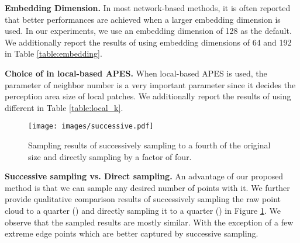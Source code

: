 \documentclass[10pt,twocolumn,letterpaper]{article}
\begin{document}
\textbf{Embedding Dimension.}
In most network-based methods, it is often reported that better performances are achieved when a larger embedding dimension is used. In our experiments, we use an embedding dimension of 128 as the default. We additionally report the results of using embedding dimensions of 64 and 192 in Table \ref{table:embedding}.

\textbf{Choice of  in local-based APES.}
When local-based APES is used, the parameter of neighbor number  is a very important parameter since it decides the perception area size of local patches. We additionally report the results of using different  in Table \ref{table:local_k}. 


\begin{table}[t]
\centering
{}
\caption{Ablation study of using a different number of neighbors for local-based edge point sampling.}
\label{table:local_k}
\end{table}

\begin{table}[t]
\centering
{}
\caption{Ablation study of considering the edge supervision. Results of using it for pre-training or joint training are both presented.}
\label{table:edgeSupervision}
\end{table}

\begin{figure}[t]
    \centering
    \texttt{[image: images/successive.pdf]} 
    \caption{Sampling results of successively sampling to a fourth of the original size and directly sampling by a factor of four. }
    \label{fig:successive}
\end{figure}


\textbf{Successive sampling vs. Direct sampling.}
An advantage of our proposed method is that we can sample any desired number of points with it.
We further provide qualitative comparison results of successively sampling the raw point cloud to a quarter () and directly sampling it to a quarter () in Figure \ref{fig:successive}. We observe that the sampled results are mostly similar. With the exception of a few extreme edge points which are better captured by successive sampling.
\end{document}
